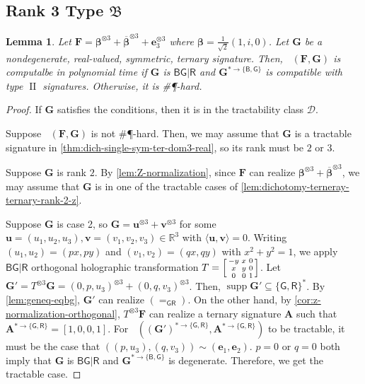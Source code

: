 \documentclass[11pt]{article}
\newtheorem{lemma}[theorem]{Lemma}
\DeclareMathOperator{\holbs}{Holant^*_2}
\DeclareMathOperator{\holts}{Holant^*_3}
\DeclareMathOperator{\supp}{supp}
\DeclareMathOperator{\typeii}{II}
\newcommand{\db}{\mathsf{B}}
\newcommand{\dg}{\mathsf{G}}
\newcommand{\dr}{\mathsf{R}}
\newcommand{\sph}{\#\P-hard\xspace}
\newcommand{\teh}{^{\otimes 3}}
\newcommand{\domres}[1]{
  ^{*\to\{#1\}}
}
\newcommand{\tractBGR}{$\mathscr{D}$\xspace}
\newcommand{\ternarytractz}{$\mathfrak{B}$\xspace}
\begin{document}
\subsection{Rank 3 Type \texorpdfstring{\ternarytractz}{B}}
\begin{lemma}\label{lem:dichotomy-terneray-ternary-rank-3-z}
  Let $\mathbf{F} = \boldsymbol{\beta} \teh + \overline{\boldsymbol{\beta}} \teh + \mathbf{e}_3 \teh$ where $\boldsymbol{\beta} = \frac{1}{\sqrt{2}} (1, i, 0)$.
  Let $\mathbf{G}$ be a nondegenerate, real-valued, symmetric, ternary signature.
  Then, $\holts(\mathbf{F}, \mathbf{G})$ is computalbe in polynomial time if $\mathbf{G}$ is $\db \dg | \dr$ and $\mathbf{G}\domres{\db, \dg}$ is compatible with type $\typeii$ signatures.
  Otherwise, it is \sph.
\end{lemma}
\begin{proof}
  If $\mathbf{G}$ satisfies the conditions, then it is in the tractability class \tractBGR.

  Suppose $\holts(\mathbf{F}, \mathbf{G})$ is not \sph.
  Then, we may assume that $\mathbf{G}$ is a tractable signature in \cref{thm:dich-single-sym-ter-dom3-real}, so its rank must be $2$ or $3$.
  
  Suppose $\mathbf{G}$ is rank $2$.
  By \cref{lem:Z-normalization}, since $\mathbf{F}$ can realize $\boldsymbol{\beta}\teh + \overline{\boldsymbol{\beta}}\teh$, we may assume that $\mathbf{G}$ is in one of the tractable cases of \cref{lem:dichotomy-terneray-ternary-rank-2-z}.

  Suppose $\mathbf{G}$ is case 2, so $\mathbf{G} = \mathbf{u}\teh + \mathbf{v}\teh$ for some $\mathbf{u} = (u_1, u_2, u_3), \mathbf{v} = (v_1, v_2, v_3) \in \mathbb{R}^3$ with $\langle \mathbf{u}, \mathbf{v} \rangle = 0$.
  Writing $(u_1, u_2) = (px, py)$ and $(v_1, v_2) = (qx, qy)$ with $x^2 + y^2 = 1$, we apply $\db \dg | \dr$ orthogonal holographic transformation $T = \begin{bsmallmatrix}
    -y & x & 0 \\
    x & y & 0 \\
    0 & 0 & 1
  \end{bsmallmatrix}$.
  Let $\mathbf{G}' = T \teh \mathbf{G} = (0, p, u_3)\teh + (0, q, v_3)\teh $.
  Then, $\supp \mathbf{G}' \subseteq \{\dg, \dr\}^*$.
  By \cref{lem:geneq-eqbg}, $\mathbf{G}'$ can realize $(=_{\dg \dr})$.
  On the other hand, by \cref{cor:z-normalization-orthogonal}, $T\teh \mathbf{F}$ can realize a ternary signature $\mathbf{A}$ such that $\mathbf{A}\domres{\dg, \dr} = [1, 0, 0, 1]$.
  For $\holbs((\mathbf{G}')\domres{\dg, \dr}, \mathbf{A}\domres{\dg, \dr})$ to be tractable, it must be the case that $((p, u_3), (q, v_3)) \sim (\mathbf{e}_1, \mathbf{e}_2)$.
  $p = 0$ or $q = 0$ both imply that $\mathbf{G}$ is $\db \dg | \dr$ and $\mathbf{G}\domres{\db, \dg}$ is degenerate.
  Therefore, we get the tractable case.


\end{proof}
\end{document}
